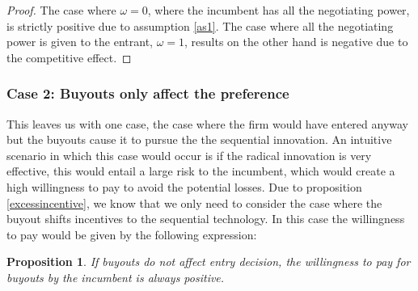 \documentclass[12pt]{report}
\newtheorem{proposition}{Proposition}
\numberwithin{equation}{section}
\begin{document}
\begin{proof}
The case where $\omega = 0$, where the incumbent has all the negotiating power, is strictly positive due to assumption \ref{as1}. The case where all the negotiating power is given to the entrant, $\omega = 1$, results on the other hand is negative due to the competitive effect.  
\end{proof}

\subsubsection{Case 2: Buyouts only affect the preference} \label{case:decision}

This leaves us with one case, the case where the firm would have entered anyway but the buyouts cause it to pursue the the sequential innovation. An intuitive scenario in which this case would occur is if the radical innovation is very effective, this would entail a large risk to the incumbent, which would create a high willingness to pay to avoid the potential losses. Due to proposition \ref{excessincentive}, we know that we only need to consider the case where the buyout shifts incentives to the sequential technology. In this case the willingness to pay would be given by the following expression: 
\begin{proposition}
If buyouts do not affect entry decision, the willingness to pay for buyouts by the incumbent is always positive. 
\end{proposition}
\end{document}
